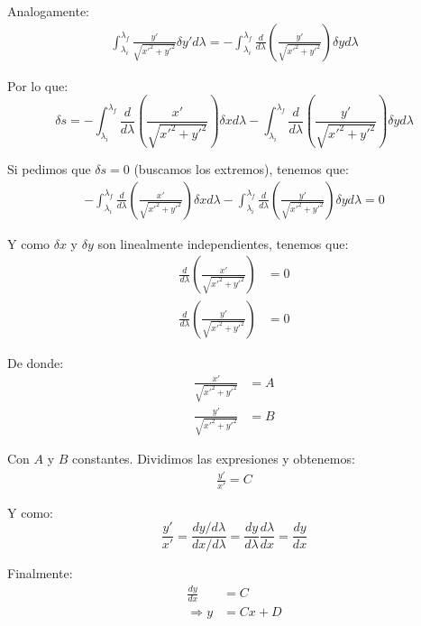 \documentclass[12pt]{report}
\begin{document}
Analogamente:
	\begin{align*}
		\int^{\lambda_{f}}_{\lambda_{i}}  \frac{y'}{\sqrt{ x'^{2} + y'^{2} }} \delta y' d\lambda = - \int^{\lambda_{f}}_{\lambda_{i}}  \frac{d}{d\lambda} \left( \frac{y'}{\sqrt{ x'^{2} + y'^{2} }}  \right) \delta y d\lambda 
	\end{align*}

Por lo que:
	\begin{equation*}
		\delta s = - \int^{\lambda_{f}}_{\lambda_{i}}  \frac{d}{d\lambda} \left( \frac{x'}{\sqrt{ x'^{2} + y'^{2} }}  \right) \delta x d\lambda  - \int^{\lambda_{f}}_{\lambda_{i}}  \frac{d}{d\lambda} \left( \frac{y'}{\sqrt{ x'^{2} + y'^{2} }}  \right) \delta y d\lambda 
	\end{equation*}	

Si pedimos que $\delta s = 0$ (buscamos los extremos), tenemos que:
	\begin{align*}
		- \int^{\lambda_{f}}_{\lambda_{i}}  \frac{d}{d\lambda} \left( \frac{x'}{\sqrt{ x'^{2} + y'^{2} }}  \right) \delta x d\lambda  - \int^{\lambda_{f}}_{\lambda_{i}}  \frac{d}{d\lambda} \left( \frac{y'}{\sqrt{ x'^{2} + y'^{2} }}  \right) \delta y d\lambda = 0
	\end{align*}

Y como $\delta x$ y  $\delta y$ son linealmente independientes, tenemos que:
	\begin{align*}
		\frac{d}{d\lambda} \left( \frac{x'}{\sqrt{ x'^{2} + y'^{2} }}  \right) &= 0 \\
		\frac{d}{d\lambda} \left( \frac{y'}{\sqrt{ x'^{2} + y'^{2} }}  \right) &= 0
	\end{align*}

De donde:
	\begin{align*}
		 \frac{x'}{\sqrt{ x'^{2} + y'^{2} }}  &= A \\
		 \frac{y'}{\sqrt{ x'^{2} + y'^{2} }}  &= B
	\end{align*}

Con $A$ y $B$ constantes. Dividimos las expresiones y obtenemos:
	\begin{align*}
		\frac{y'}{x'} = C
	\end{align*}

Y como:
	\begin{equation*}
		\frac{y'}{x'} = \frac{dy/d\lambda}{dx/d\lambda} = \frac{dy}{d\lambda} \frac{d\lambda}{dx} = \frac{dy}{dx}
	\end{equation*}

Finalmente:
	\begin{align*}
		\frac{dy}{dx} &= C \\
		\Rightarrow y &= Cx + D
	\end{align*}
	
\end{document}
